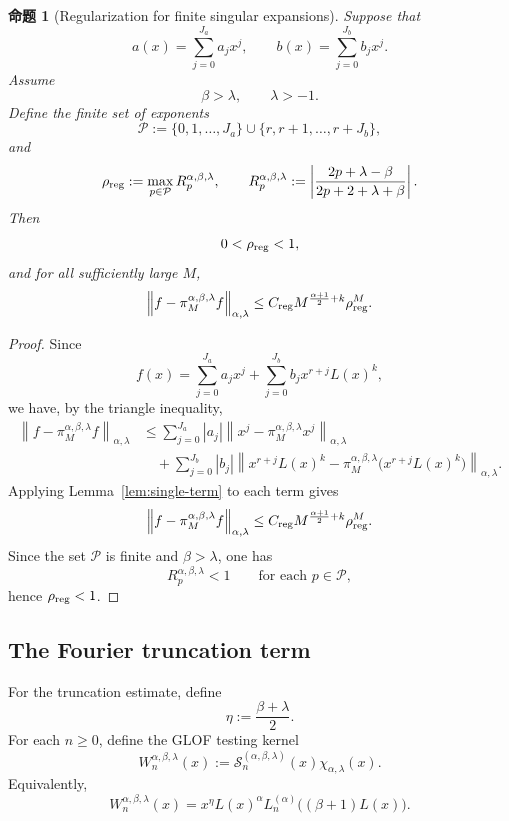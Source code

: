\documentclass[UTF8]{ctexart}
\newtheorem{proposition}{命题}
\begin{document}
\begin{proposition}[Regularization for finite singular expansions]
\label{prop:finite-reg}
Suppose that
\[
    a(x)=\sum_{j=0}^{J_a}a_jx^j,
    \qquad
    b(x)=\sum_{j=0}^{J_b}b_jx^j .
\]
Assume
\[
    \beta>\lambda,
    \qquad
    \lambda>-1.
\]
Define the finite set of exponents
\[
    \mathcal P
    :=
    \{0,1,\dots,J_a\}
    \cup
    \{r,r+1,\dots,r+J_b\},
\]
and
\[
    \rho_{\rm reg}
    :=
    \max_{p\in\mathcal P}
    R_p^{\alpha,\beta,\lambda},
    \qquad
    R_p^{\alpha,\beta,\lambda}
    :=
    \left|
    \frac{2p+\lambda-\beta}
    {2p+2+\lambda+\beta}
    \right|.
\]
Then
\[
    0<\rho_{\rm reg}<1,
\]
and for all sufficiently large $M$,
\[
    \left\|
    f-\pi_M^{\alpha,\beta,\lambda}f
    \right\|_{\alpha,\lambda}
    \le
    C_{\rm reg}
    M^{\frac{\alpha+1}{2}+k}
    \rho_{\rm reg}^M .
\]
\end{proposition}

\begin{proof}
Since
\[
    f(x)
    =
    \sum_{j=0}^{J_a}a_jx^j
    +
    \sum_{j=0}^{J_b}b_jx^{r+j}L(x)^k,
\]
we have, by the triangle inequality,
\[
\begin{aligned}
    \left\|
    f-\pi_M^{\alpha,\beta,\lambda}f
    \right\|_{\alpha,\lambda}
    &\le
    \sum_{j=0}^{J_a}|a_j|
    \left\|
    x^j-\pi_M^{\alpha,\beta,\lambda}x^j
    \right\|_{\alpha,\lambda}
    \\
    &\quad+
    \sum_{j=0}^{J_b}|b_j|
    \left\|
    x^{r+j}L(x)^k
    -
    \pi_M^{\alpha,\beta,\lambda}
    \bigl(x^{r+j}L(x)^k\bigr)
    \right\|_{\alpha,\lambda}.
\end{aligned}
\]
Applying Lemma~\ref{lem:single-term} to each term gives
\[
    \left\|
    f-\pi_M^{\alpha,\beta,\lambda}f
    \right\|_{\alpha,\lambda}
    \le
    C_{\rm reg}
    M^{\frac{\alpha+1}{2}+k}
    \rho_{\rm reg}^M .
\]
Since the set $\mathcal P$ is finite and $\beta>\lambda$, one has
\[
    R_p^{\alpha,\beta,\lambda}<1
    \qquad\text{for each }p\in\mathcal P,
\]
hence $\rho_{\rm reg}<1$.
\end{proof}

\subsection{The Fourier truncation term}

For the truncation estimate, define
\[
    \eta:=\frac{\beta+\lambda}{2}.
\]
For each $n\ge 0$, define the GLOF testing kernel
\[
    W_n^{\alpha,\beta,\lambda}(x)
    :=
    \mathcal S_n^{(\alpha,\beta,\lambda)}(x)
    \chi_{\alpha,\lambda}(x).
\]
Equivalently,
\[
    W_n^{\alpha,\beta,\lambda}(x)
    =
    x^\eta
    L(x)^\alpha
    L_n^{(\alpha)}\bigl((\beta+1)L(x)\bigr).
\]
\end{document}
